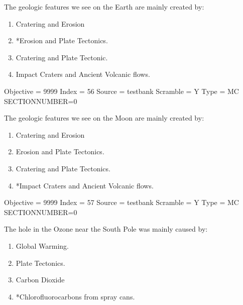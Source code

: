 \documentclass[11pt]{article}
\begin{document}
\begin{enumerate}
\begin{minipage}{\textwidth}
\begin{minipage}{\textwidth}
\item The geologic features we see on the Earth are mainly created by:
\begin{enumerate} 
\setlength{\itemsep}{1pt} 
\setlength{\parskip}{0pt} 
\setlength{\parsep}{0pt}
\setlength{\multicolsep}{1pt} 
\item Cratering and Erosion
\item *Erosion and Plate Tectonics.
\item Cratering and Plate Tectonic.
\item Impact Craters and Ancient Volcanic flows.
\end{enumerate} 
Objective = 9999
Index = 56
Source = testbank
Scramble = Y
Type = MC
SECTIONNUMBER=0
\end{minipage}
\end{minipage}
\vskip 0.20in

\begin{minipage}{\textwidth}
\begin{minipage}{\textwidth}
\item The geologic features we see on the Moon are mainly created by:
\begin{enumerate} 
\setlength{\itemsep}{1pt} 
\setlength{\parskip}{0pt} 
\setlength{\parsep}{0pt}
\setlength{\multicolsep}{1pt} 
\item Cratering and Erosion
\item Erosion and Plate   Tectonics.
\item Cratering and Plate Tectonics.
\item *Impact Craters and Ancient Volcanic flows.
\end{enumerate} 
Objective = 9999
Index = 57
Source = testbank
Scramble = Y
Type = MC
SECTIONNUMBER=0
\end{minipage}
\end{minipage}
\vskip 0.20in

\begin{minipage}{\textwidth}
\begin{minipage}{\textwidth}
\item The hole in the Ozone near the South Pole was mainly caused by:
\begin{multicols}{2}
\begin{enumerate} 
\setlength{\itemsep}{1pt} 
\setlength{\parskip}{0pt} 
\setlength{\parsep}{0pt}
\setlength{\multicolsep}{1pt} 
\item Global Warming.
\item Plate Tectonics.
\item Carbon Dioxide
\item *Chlorofluorocarbons from spray cans.
\end{enumerate} 
\vfill 
\end{multicols}


\end{minipage}
\end{minipage}
\end{enumerate}
\end{document}
